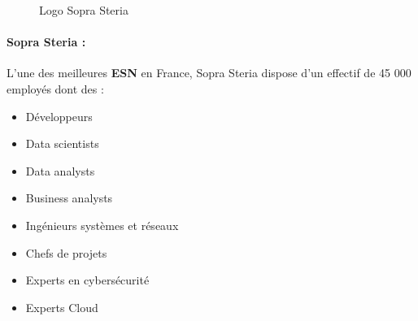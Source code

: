 \documentclass{article}
\begin{document}
\begin{figure}[H]
  \caption{Logo Sopra Steria}
\end{figure}

\paragraph{Sopra Steria :}
L'une des meilleures \textbf{ESN} en France, Sopra Steria dispose d'un effectif de 45 000 employés dont des :
  \begin{itemize}
    \item Développeurs
    \item Data scientists
    \item Data analysts
    \item Business analysts
    \item Ingénieurs systèmes et réseaux
    \item Chefs de projets
    \item Experts en cybersécurité
    \item Experts Cloud
  \end{itemize}
\end{document}
